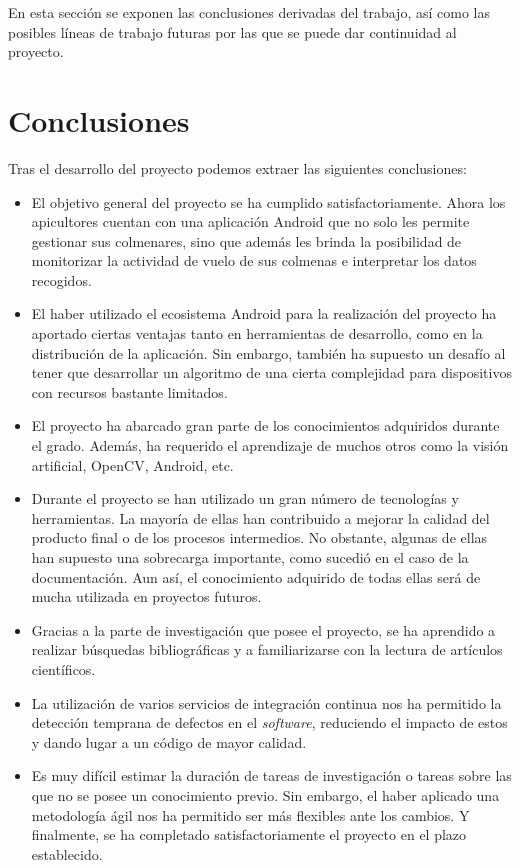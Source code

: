 
En esta sección se exponen las conclusiones derivadas del trabajo, así
como las posibles líneas de trabajo futuras por las que se puede dar
continuidad al proyecto.

\section{Conclusiones}\label{conclusiones}

Tras el desarrollo del proyecto podemos extraer las siguientes
conclusiones:

\begin{itemize}
\tightlist
\item
  El objetivo general del proyecto se ha cumplido satisfactoriamente.
  Ahora los apicultores cuentan con una aplicación Android que no solo
  les permite gestionar sus colmenares, sino que además les brinda la
  posibilidad de monitorizar la actividad de vuelo de sus colmenas e
  interpretar los datos recogidos.
\item
  El haber utilizado el ecosistema Android para la realización del
  proyecto ha aportado ciertas ventajas tanto en herramientas de
  desarrollo, como en la distribución de la aplicación. Sin embargo,
  también ha supuesto un desafío al tener que desarrollar un algoritmo
  de una cierta complejidad para dispositivos con recursos bastante
  limitados.
\item
  El proyecto ha abarcado gran parte de los conocimientos adquiridos
  durante el grado. Además, ha requerido el aprendizaje de muchos otros
  como la visión artificial, OpenCV, Android, etc.
\item
  Durante el proyecto se han utilizado un gran número de tecnologías y
  herramientas. La mayoría de ellas han contribuido a mejorar la calidad
  del producto final o de los procesos intermedios. No obstante, algunas
  de ellas han supuesto una sobrecarga importante, como sucedió en el
  caso de la documentación. Aun así, el conocimiento adquirido de todas
  ellas será de mucha utilizada en proyectos futuros.
\item
  Gracias a la parte de investigación que posee el proyecto, se ha
  aprendido a realizar búsquedas bibliográficas y a familiarizarse con
  la lectura de artículos científicos.
\item
  La utilización de varios servicios de integración continua nos ha
  permitido la detección temprana de defectos en el \emph{software},
  reduciendo el impacto de estos y dando lugar a un código de mayor
  calidad.
\item
  Es muy difícil estimar la duración de tareas de investigación o tareas
  sobre las que no se posee un conocimiento previo. Sin embargo, el
  haber aplicado una metodología ágil nos ha permitido ser más flexibles
  ante los cambios. Y finalmente, se ha completado satisfactoriamente el
  proyecto en el plazo establecido.
\end{itemize}

